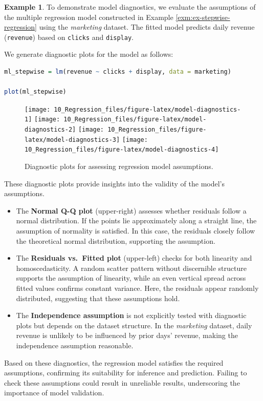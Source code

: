 \documentclass[
  11pt,
]{book}
\newcommand{\passthrough}[1]{#1}
\providecommand{\tightlist}{%
  \setlength{\itemsep}{0pt}\setlength{\parskip}{0pt}}
\theoremstyle{definition}
\theoremstyle{definition}
\newtheorem{example}{Example}[chapter]
\theoremstyle{definition}
\theoremstyle{definition}
\theoremstyle{remark}
\begin{document}
\begin{example}
\protect\hypertarget{exm:ex-diagnosing-regression}{}\label{exm:ex-diagnosing-regression}To demonstrate model diagnostics, we evaluate the assumptions of the multiple regression model constructed in Example \ref{exm:ex-stepwise-regression} using the \emph{marketing} dataset. The fitted model predicts daily revenue (\passthrough{\lstinline!revenue!}) based on \passthrough{\lstinline!clicks!} and \passthrough{\lstinline!display!}.

We generate diagnostic plots for the model as follows:

\begin{lstlisting}[language=R]
ml_stepwise = lm(revenue ~ clicks + display, data = marketing)

plot(ml_stepwise)  
\end{lstlisting}

\begin{figure}[H]
\texttt{[image: 10\_Regression\_files/figure-latex/model-diagnostics-1]} \texttt{[image: 10\_Regression\_files/figure-latex/model-diagnostics-2]} \texttt{[image: 10\_Regression\_files/figure-latex/model-diagnostics-3]} \texttt{[image: 10\_Regression\_files/figure-latex/model-diagnostics-4]} \caption{Diagnostic plots for assessing regression model assumptions.}\label{fig:model-diagnostics}
\end{figure}

These diagnostic plots provide insights into the validity of the model's assumptions.

\begin{itemize}
\tightlist
\item
  The \textbf{Normal Q-Q plot} (upper-right) assesses whether residuals follow a normal distribution. If the points lie approximately along a straight line, the assumption of normality is satisfied. In this case, the residuals closely follow the theoretical normal distribution, supporting the assumption.\\
\item
  The \textbf{Residuals vs.~Fitted plot} (upper-left) checks for both linearity and homoscedasticity. A random scatter pattern without discernible structure supports the assumption of linearity, while an even vertical spread across fitted values confirms constant variance. Here, the residuals appear randomly distributed, suggesting that these assumptions hold.\\
\item
  The \textbf{Independence assumption} is not explicitly tested with diagnostic plots but depends on the dataset structure. In the \emph{marketing} dataset, daily revenue is unlikely to be influenced by prior days' revenue, making the independence assumption reasonable.
\end{itemize}

Based on these diagnostics, the regression model satisfies the required assumptions, confirming its suitability for inference and prediction. Failing to check these assumptions could result in unreliable results, underscoring the importance of model validation.
\end{example}
\end{document}
